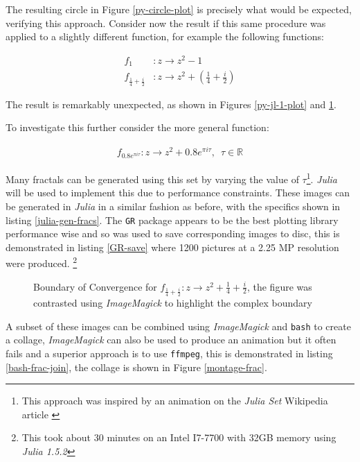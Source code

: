 \documentclass[a4paper,11pt,twoside]{article}
\begin{document}
The resulting circle in Figure \ref{py-circle-plot} is precisely what would be expected, verifying this approach.
Consider now the result if this same procedure was applied to a slightly different function, for example the following functions:

\begin{align*}
f_{1}&: z \rightarrow
z^{2} - 1 \\
f_{\frac{1}{4} + \frac{i}{2}}&: z
\rightarrow z^{2} + (\frac{1}{4} + \frac{i}{2})
\end{align*}

The result is
remarkably unexpected, as shown in Figures \ref{py-jl-1-plot} and \ref{py-jl-rab-plot}.




To investigate this further consider the
more general function:

\begin{align}
f_{0.8 e^{\pi i \tau}}: z \rightarrow z^{2} + 0.8 e^{\pi
i \tau}, \enspace \tau \in \mathbb{R}
\end{align}

Many fractals can be generated using
this set by varying the value of \(\tau\)\footnote{This approach was inspired by an animation on the \emph{Julia Set} Wikipedia article \cite{JuliaSet2020}}. \emph{Julia} will be used to implement this due to performance constraints. These images can be
generated in \emph{Julia} in a similar fashion as before, with the specifics shown in
listing \ref{julia-gen-fracs}. The \texttt{GR} package appears to be the best plotting
library performance wise and so was used to save corresponding images to disc,
this is demonstrated in listing \ref{GR-save} where 1200 pictures at a 2.25 MP
resolution were produced. \footnote{This took about 30 minutes on an Intel I7-7700 with 32GB memory using \emph{Julia 1.5.2}}


\begin{figure}
\centering

\caption{\label{py-jl-rab-plot}Boundary of Convergence for \(f_{\frac{1}{4} + \frac{i}{2}}: z \rightarrow z^{2} + \frac{1}{4} + \frac{i}{2}\), the figure was contrasted using \emph{ImageMagick} to highlight the complex boundary}
\end{figure}

A subset of these images can be combined using \emph{ImageMagick} and \texttt{bash} to
create a collage, \emph{ImageMagick} can also be used to produce an animation but it often
fails and a superior approach is to use \texttt{ffmpeg}, this is demonstrated in
listing \ref{bash-frac-join}, the collage is shown in Figure \ref{montage-frac}.
\end{document}
